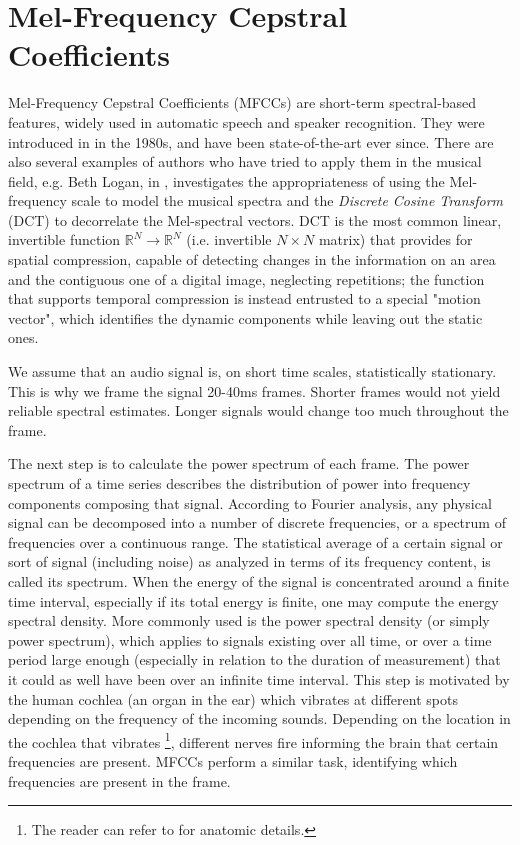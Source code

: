 \documentclass[english, LaM, oneside, noexaminfo]{sapthesis}
\begin{document}

\section{Mel-Frequency Cepstral Coefficients}
\label{MFCCs}
Mel-Frequency Cepstral Coefficients (MFCCs) are short-term spectral-based features, widely used in automatic speech and speaker recognition. They were introduced in \cite{davis1980comparison} in the 1980s, and have been state-of-the-art ever since. There are also several examples of authors who have tried to apply them in the musical field, e.g. Beth Logan, in \cite{logan2000mel}, investigates the appropriateness of using the Mel-frequency scale to model the musical spectra and the \textit{Discrete Cosine Transform} (DCT) to decorrelate the Mel-spectral vectors. DCT is the most common linear, invertible function $\mathbb{R}^N \rightarrow \mathbb{R}^N$ (i.e. invertible $N \times N$ matrix) that provides for spatial compression, capable of detecting changes in the information on an area and the contiguous one of a digital image, neglecting repetitions; the function that supports temporal compression is instead entrusted to a special "motion vector", which identifies the dynamic components while leaving out the static ones.

We assume that an audio signal is, on short time scales, statistically stationary. This is why we frame the signal 20-40ms frames. Shorter frames would not yield reliable spectral estimates. Longer signals would change too much throughout the frame.

The next step is to calculate the power spectrum of each frame. The power spectrum of a time series describes the distribution of power into frequency components composing that signal. According to Fourier analysis, any physical signal can be decomposed into a number of discrete frequencies, or a spectrum of frequencies over a continuous range. The statistical average of a certain signal or sort of signal (including noise) as analyzed in terms of its frequency content, is called its spectrum.
When the energy of the signal is concentrated around a finite time interval, especially if its total energy is finite, one may compute the energy spectral density. More commonly used is the power spectral density (or simply power spectrum), which applies to signals existing over all time, or over a time period large enough (especially in relation to the duration of measurement) that it could as well have been over an infinite time interval. This step is motivated by the human cochlea (an organ in the ear) which vibrates at different spots depending on the frequency of the incoming sounds. Depending on the location in the cochlea that vibrates \footnote{The reader can refer to \cite{anastasi2012trattato} for anatomic details.}, different nerves fire informing the brain that certain frequencies are present. MFCCs perform a similar task, identifying which frequencies are present in the frame.
\end{document}
